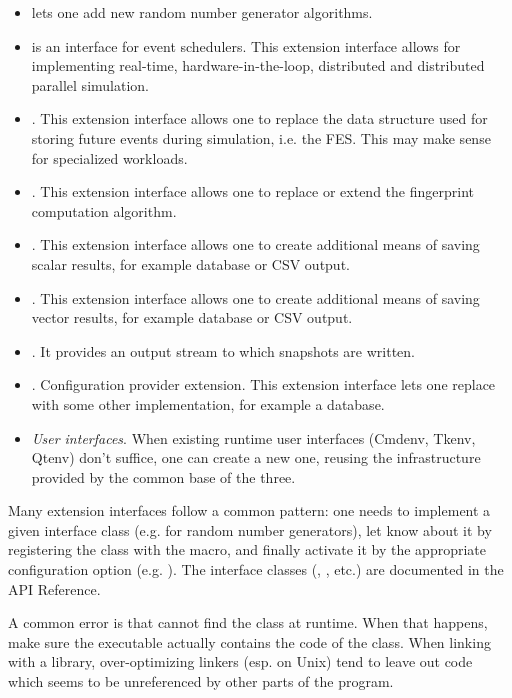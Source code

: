\begin{itemize}
   \item {} lets one add new random number generator algorithms.
   \item {} is an interface for event schedulers.
     This extension interface allows for implementing real-time,
     hardware-in-the-loop, distributed and distributed parallel simulation.
   \item {}. This extension interface allows one to
     replace the data structure used for storing future events during
     simulation, i.e. the FES. This may make sense for specialized
     workloads.
   \item {}. This extension interface allows one
     to replace or extend the fingerprint computation algorithm.
   \item {}. This extension interface allows
     one to create additional means of saving scalar results, for example
     database or CSV output.
   \item {}. This extension interface allows
     one to create additional means of saving vector results, for example
     database or CSV output.
   \item {}. It provides an output stream to which
     snapshots are written.
   \item {}. Configuration provider extension.
     This extension interface lets one replace 
     with some other implementation, for example a database.
   \item \textit{User interfaces}. When existing runtime user interfaces
     (Cmdenv, Tkenv, Qtenv) don't suffice, one can create a new one,
     reusing the infrastructure provided by the common base of the three.
\end{itemize}

Many extension interfaces follow a common pattern: one needs to implement a
given interface class (e.g.  for random number generators),
let {\opp} know about it by registering the class with the
 macro, and finally activate it by the appropriate
configuration option (e.g. ). The interface classes
(, , etc.) are documented in the API
Reference.

\begin{note}
A common error is that {\opp} cannot find the class at runtime. When that
happens, make sure the executable actually contains the code of the class.
When linking with a library, over-optimizing linkers (esp. on Unix) tend to
leave out code which seems to be unreferenced by other parts of the
program.
\end{note}

